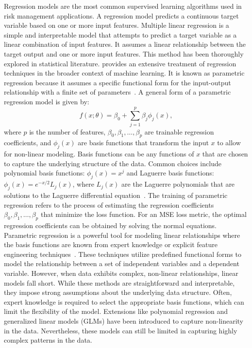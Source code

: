 Regression models are the most common supervised learning algorithms used in risk management applications.
A regression model predicts a continuous target variable based on one or more input features.
Multiple linear regression is a simple and interpretable model that attempts to predict a target variable as a linear combination of input features. 
It assumes a linear relationship between the target output and one or more input features. 
This method has been thoroughly explored in statistical literature. 
\citet{bishop2006pattern} provides an extensive treatment of regression techniques in the broader context of machine learning.
It is known as parametric regression because it assumes a specific functional form for the input-output relationship with a finite set of parameters~\citep{seber2012linear}.
A general form of a parametric regression model is given by:
\begin{equation} \label{eq:regression}
    f(x; \theta) = \beta_0 + \sum_{j=1}^{p} \beta_j \phi_j(x),
\end{equation}
where $p$ is the number of features, $\beta_0, \beta_1, \ldots, \beta_p$ are trainable regression coefficients, and $\phi_j(x)$ are basis functions that transform the input $x$ to allow for non-linear modeling.
Basis functions can be any functions of $x$ that are chosen to capture the underlying structure of the data.
Common choices include polynomial basis functions: $\phi_j(x) = x^j$ and Laguerre basis functions: $\phi_j(x) = e^{-x/2} L_j(x)$, where $L_j(x)$ are the Laguerre polynomials that are solutions to the Laguerre differential equation~\citep{szeg1939orthogonal}.
The training of parametric regression refers to the process of estimating the regression coefficients $\beta_0, \beta_1, \ldots, \beta_p$ that minimize the loss function.
For an MSE loss metric, the optimal regression coefficients can be obtained by solving the normal equations.
Parametric regression is a powerful tool for modeling linear relationships where the basis functions are known from expert knowledge or explicit feature engineering techniques~\citep{hastie2009elements}.
These techniques utilize predefined functional forms to model the relationship between a set of independent variables and a dependent variable. 
However, when data exhibits complex, non-linear relationships, linear models fall short. 
While these methods are straightforward and interpretable, they impose strong assumptions about the underlying data structure.
Often, expert knowledge is required to select the appropriate basis functions, which can limit the flexibility of the model.
Extensions like polynomial regression and generalized linear models (GLMs) have been introduced to capture non-linearity in the data.
Nevertheless, these models can still be limited in capturing highly complex patterns in the data. 


